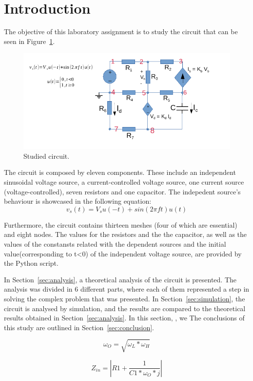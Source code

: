 \section{Introduction}
\label{sec:introduction}

The objective of this laboratory assignment is to study the circuit that can be seen in Figure~\ref{fig:T2Circuit}.

\vspace{4.0cm}

\begin{figure}[h] \centering
\includegraphics[width=0.8\linewidth]{T2Circuit.pdf}
\caption{Studied circuit.}
\label{fig:T2Circuit}
\end{figure}
 
The circuit is composed by eleven components. These include an independent sinusoidal voltage source, a current-controlled voltage source, one current source (voltage-controlled), seven resistors and one capacitor.
The indepedent source's behaviour is showcased in the following equation:
\begin {equation}
   v_s(t)= V_s u(-t) + sin(2\pi f t)u(t)
   \end {equation}
   
 Furthermore, the circuit contains thirteen meshes (four of which are essential) and eight nodes.
The values for the resistors and the the capacitor, as well as the values of the constansts related with the dependent sources and the initial value(corresponding to t<0) of the independent voltage source, are provided by the Python script.

In Section~\ref{sec:analysis}, a theoretical analysis of the circuit is
presented. The analysis was divided in 6 different parts, where each of them represented a step in solving the complex problem that was presented. In Section~\ref{sec:simulation}, the circuit is analysed by
simulation, and the results are compared to the theoretical results obtained in Section~\ref{sec:analysis}. In this section, , we  The conclusions of this study are outlined in
Section~\ref{sec:conclusion}.

\begin{equation}
\omega_O = \sqrt{\omega_L * \omega_H}
\end{equation}

\begin{equation}
Z_{in} = |R1 + \frac{1}{C1*\omega_O *j}|
\end{equation}


